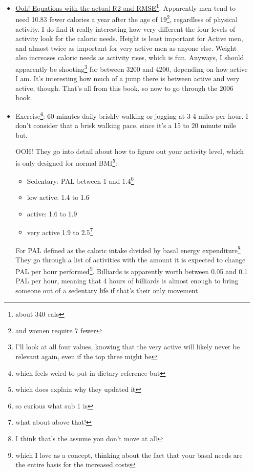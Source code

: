 \documentclass[12pt]{article}[titlepage]
\renewcommand{\,}{\textsuperscript{,}}
\begin{document}
\begin{itemize}  
\item \href{https://nap.nationalacademies.org/read/26818/chapter/2\#3}{Ooh! Equations with the actual R2 and RMSE}\footnote{about 340 cals}. Apparently men tend to need 10.83 fewer calories a year after the age of 19\footnote{and women require 7 fewer}, regardless of physical activity.  
I do find it really interesting how very different the four levels of activity look for the caloric needs.  
Height is least important for Active men, and almost twice as important for very active men as anyone else.  
Weight also increases caloric needs as activity rises, which is fun.   
Anyways, I should apparently be shooting\footnote{I'll look at all four values, knowing that the very active will likely never be relevant again, even if the top three might be} for between 3200 and 4200, depending on how active I am. It's interesting how much of a jump there is between active and very active, though. That's all from this book, so now to go through the 2006 book.  
\item Exercise\footnote{which feels weird to put in dietary reference but}: 60 minutes daily briskly walking or jogging at 3-4 miles per hour. I don't consider that a brisk walking pace, since it's a 15 to 20 minute mile but.

OOH! They go into detail about how to figure out your activity level, which is only designed for normal BMI\footnote{which does explain why they updated it}:  
\begin{itemize}  
\item Sedentary: PAL between 1 and 1.4\footnote{so curious what sub 1 is}  
\item low active: 1.4 to 1.6  
\item active: 1.6 to 1.9  
\item very active 1.9 to 2.5\footnote{what about above that!}  
\end{itemize}  
For PAL defined as the caloric intake divided by basal energy expenditure\footnote{I think that's the assume you don't move at all}  
They go through a list of activities with the amount it is expected to change PAL per hour performed\footnote{which I love as a concept, thinking about the fact that your basal needs are the entire basis for the increased costs}. Billiards is apparently worth between 0.05 and 0.1 PAL per hour, meaning that 4 hours of billiards is almost enough to bring someone out of a sedentary life if that's their only movement.  



\end{itemize}
\end{document}
